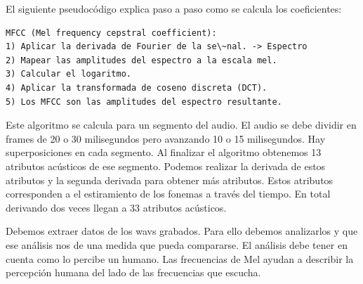 \documentclass[11pt,a4paper,twoside]{tesis}
\begin{document}
El siguiente pseudocódigo explica paso a paso como se calcula los coeficientes:
\begin{lstlisting}
MFCC (Mel frequency cepstral coefficient):
1) Aplicar la derivada de Fourier de la se\~nal. -> Espectro
2) Mapear las amplitudes del espectro a la escala mel.
3) Calcular el logaritmo.
4) Aplicar la transformada de coseno discreta (DCT).
5) Los MFCC son las amplitudes del espectro resultante.
\end{lstlisting}

Este algoritmo se calcula para un segmento del audio. El audio se debe dividir en frames de 20 o 30 milisegundos pero avanzando 10 o 15 milisegundos. Hay superposiciones en cada segmento. Al finalizar el algoritmo obtenemos 13 atributos acústicos de ese segmento. Podemos realizar la derivada de estos atributos y la segunda derivada para obtener más atributos. Estos atributos corresponden a el estiramiento de los fonemas a través del tiempo. En total derivando dos veces llegan a 33 atributos acústicos.

Debemos extraer datos de los wavs grabados. Para ello debemos analizarlos y que ese análisis nos de una medida que pueda compararse. El análisis debe tener en cuenta como lo percibe un humano. Las frecuencias de Mel ayudan a describir la percepción humana del lado de las frecuencias que escucha. 
\end{document}
